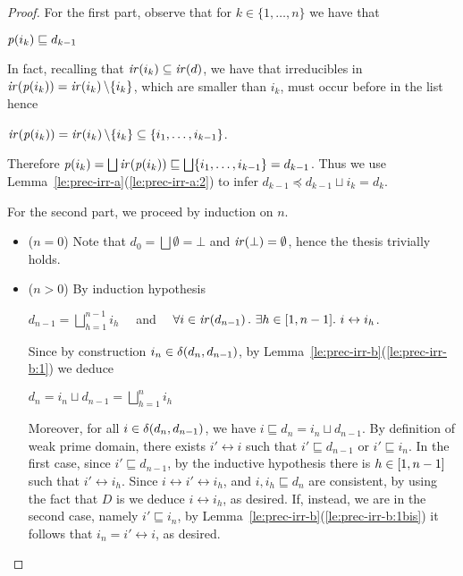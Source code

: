 \begin{proof}
  For the first part, observe that for $k \in \{ 1, \ldots, n\}$ we have that
  \begin{center}
    $\mathit{p}({i_k}) \sqsubseteq d_{k-1}$
  \end{center}
  In fact, recalling that $\mathop{\mathit{ir}({i_k})} \subseteq \mathop{\mathit{ir}({d})}$, we have that
  irreducibles in $\mathop{\mathit{ir}({\mathit{p}({i_k})})} = \mathop{\mathit{ir}({i_k})} \setminus \{ i_k \}$, which are
  smaller than $i_k$, must occur before in the list hence
  \begin{center}
    $\mathop{\mathit{ir}({\mathit{p}({i_k})})} = \mathop{\mathit{ir}({i_k})} \setminus \{ i_k \} \subseteq \{ i_1, \ldots,
    i_{k-1}\}$.
  \end{center}
  Therefore
  $\mathit{p}({i_k}) = \bigsqcup \mathop{\mathit{ir}({\mathit{p}({i_k})})} \sqsubseteq \bigsqcup \{ i_1,
  \ldots, i_{k-1}\} = d_{k-1}$. Thus we use
  Lemma~\ref{le:prec-irr-a}(\ref{le:prec-irr-a:2}) to infer
  $d_{k-1} \preceq d_{k-1} \sqcup i_k = d_k$.
  
  \bigskip

  For the second part, we proceed by induction on $n$. 
  
  \begin{itemize}
  \item ($n=0$) Note that $d_0 = \bigsqcup \emptyset = \bot$ and
    $\mathop{\mathit{ir}({\bot})} = \emptyset$, hence the thesis trivially holds.

  \item ($n>0$) By induction hypothesis
    \begin{center}
      $d_{n-1} = \bigsqcup_{h=1}^{n-1} i_h$ \ \ and \ \
    $\forall i \in \mathop{\mathit{ir}({d_{n-1}})}.\ \exists h \in [{1},{n-1}].\ i
    \leftrightarrow i_h$.
    \end{center}

    Since by construction $i_n \in \delta({d_n},{d_{n-1}})$,
    by Lemma~\ref{le:prec-irr-b}(\ref{le:prec-irr-b:1}) we deduce
    \begin{center}
      $d_n = i_n \sqcup d_{n-1} = {\bigsqcup_{h=1}^{n} i_h}$
    \end{center}
    
    Moreover, for all $i \in \delta({d_n},{d_{n-1}})$, we have $i
    \sqsubseteq d_n = i_n \sqcup
    d_{n-1}$. By definition of weak prime domain, there exists $i'
    \leftrightarrow i$ such that $i' \sqsubseteq d_{n-1}$ or $i'
    \sqsubseteq i_n$. In the first case, since $i' \sqsubseteq
    d_{n-1}$, by the inductive hypothesis there is $h \in
    [{1},{n-1}]$ such that $i' \leftrightarrow i_h$. Since $i
    \leftrightarrow i' \leftrightarrow i_h$, and $i, i_h \sqsubseteq
    d_n$ are consistent, by using the fact that
      $D$ is {\wi} we deduce $i \leftrightarrow
  i_h$, as desired. If, instead, we are in the second case, namely $i'
  \sqsubseteq
  i_n$, by Lemma~\ref{le:prec-irr-b}(\ref{le:prec-irr-b:1bis}) it
  follows that $i_n = i' \leftrightarrow i$, as desired.
  \end{itemize}
\end{proof}


